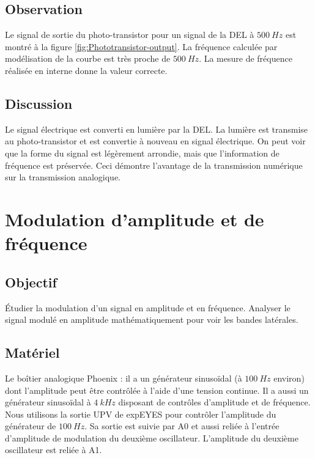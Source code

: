 \documentclass{book}
\begin{document}
\subsection{Observation}


Le signal de sortie du photo-transistor pour un signal de la DEL à $500\ Hz$ est montré à la figure  \ref{fig:Phototransistor-output}. La fréquence calculée par modélisation de la courbe est très proche de $500\ Hz$. La mesure de fréquence réalisée en interne donne la valeur correcte.

\subsection{Discussion}


Le signal électrique est converti en lumière par la DEL. La lumière est transmise au photo-transistor et est convertie à nouveau en signal électrique. On peut voir que la forme du signal est légèrement arrondie, mais que l'information de fréquence est préservée. Ceci démontre l'avantage de la transmission numérique sur la transmission analogique.







\section{Modulation d'amplitude et de fréquence}



\subsection{Objectif}


Étudier la modulation d'un signal en amplitude et en fréquence. Analyser le signal modulé en amplitude mathématiquement pour voir les bandes latérales.




\subsection{Matériel}


Le boîtier analogique Phoenix : il a un générateur sinusoïdal (à $100\ Hz$ environ) dont l'amplitude peut être contrôlée à l'aide d'une tension continue. Il a aussi un générateur sinusoïdal à $4\ kHz$ disposant de contrôles d'amplitude et de fréquence. Nous utilisons la sortie UPV de expEYES pour contrôler l'amplitude du générateur de $100\ Hz$. Sa sortie est suivie par A0 et aussi reliée à l'entrée d'amplitude de modulation du deuxième oscillateur. L'amplitude du deuxième oscillateur est reliée à A1.
\end{document}
